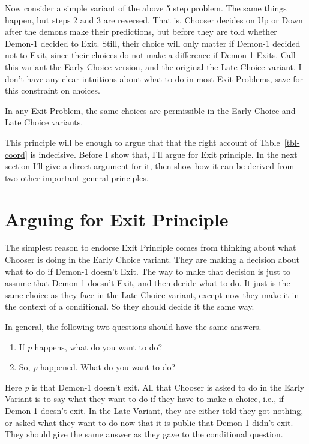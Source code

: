 \documentclass[
  12pt,
  letterpaper,
  DIV=11,
  numbers=noendperiod]{scrreprt}
\providecommand{\tightlist}{%
  \setlength{\itemsep}{0pt}\setlength{\parskip}{0pt}}\usepackage{longtable,booktabs,array}
\begin{document}
Now consider a simple variant of the above 5 step problem. The same
things happen, but steps 2 and 3 are reversed. That is, Chooser decides
on Up or Down after the demons make their predictions, but before they
are told whether Demon-1 decided to Exit. Still, their choice will only
matter if Demon-1 decided not to Exit, since their choices do not make a
difference if Demon-1 Exits. Call this variant the Early Choice version,
and the original the Late Choice variant. I don't have any clear
intuitions about what to do in most Exit Problems, save for this
constraint on choices.

\begin{description}
\tightlist
\item[Exit Principle]
In any Exit Problem, the same choices are permissible in the Early
Choice and Late Choice variants.
\end{description}

This principle will be enough to argue that that the right account of
Table~\ref{tbl-coord} is indecisive. Before I show that, I'll argue for
Exit principle. In the next section I'll give a direct argument for it,
then show how it can be derived from two other important general
principles.

\section{Arguing for Exit Principle}\label{sec-exit-principle-argument}

The simplest reason to endorse Exit Principle comes from thinking about
what Chooser is doing in the Early Choice variant. They are making a
decision about what to do if Demon-1 doesn't Exit. The way to make that
decision is just to assume that Demon-1 doesn't Exit, and then decide
what to do. It just is the same choice as they face in the Late Choice
variant, except now they make it in the context of a conditional. So
they should decide it the same way.

In general, the following two questions should have the same answers.

\begin{enumerate}
\def\labelenumi{\arabic{enumi}.}
\tightlist
\item
  If \emph{p} happens, what do you want to do?
\item
  So, \emph{p} happened. What do you want to do?
\end{enumerate}

Here \emph{p} is that Demon-1 doesn't exit. All that Chooser is asked to
do in the Early Variant is to say what they want to do if they have to
make a choice, i.e., if Demon-1 doesn't exit. In the Late Variant, they
are either told they got nothing, or asked what they want to do now that
it is public that Demon-1 didn't exit. They should give the same answer
as they gave to the conditional question.
\end{document}
